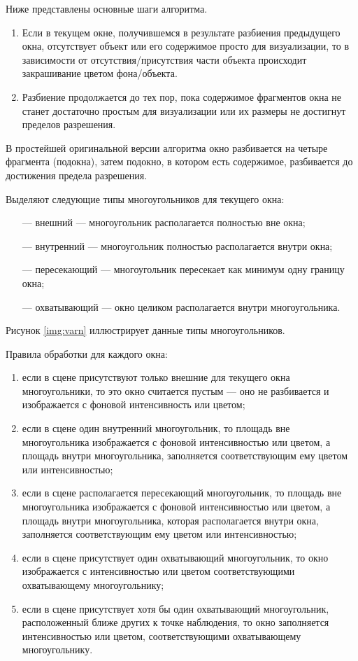 \begin{enumerate}
Ниже представлены основные шаги алгоритма.
\begin{enumerate} 
	\item Если в текущем окне, получившемся в результате разбиения предыдущего окна, отсутствует объект или его содержимое просто для визуализации, то в зависимости от отсутствия/присутствия части объекта происходит закрашивание цветом фона/объекта.
	\item Разбиение продолжается до тех пор, пока содержимое фрагментов окна не станет достаточно простым для визуализации или их размеры не достигнут пределов разрешения.
\end{enumerate}

В простейшей оригинальной версии алгоритма окно разбивается на четыре фрагмента (подокна), затем подокно, в котором есть содержимое, разбивается до достижения предела разрешения.

Выделяют следующие типы многоугольников для текущего окна:
\begin{itemize}
	\item[---] внешний --- многоугольник располагается полностью вне окна;
	\item[---] внутренний --- многоугольник полностью располагается внутри окна;
	\item[---] пересекающий --- многоугольник пересекает как минимум одну границу окна;
	\item[---] охватывающий --- окно целиком располагается внутри многоугольника.
\end{itemize}

Рисунок \ref{img:varn} иллюстрирует данные типы многоугольников.


Правила обработки для каждого окна:
\begin{enumerate}
	\item если в сцене присутствуют только внешние для текущего окна многоугольники, то это окно считается пустым --- оно не разбивается и изображается с фоновой интенсивность или цветом;
	\item если в сцене один внутренний многоугольник, то площадь вне многоугольника изображается с фоновой интенсивностью или цветом, а площадь внутри многоугольника, заполняется соответствующим ему цветом или интенсивностью;
	\item если в сцене располагается пересекающий многоугольник, то площадь вне многоугольника изображается с фоновой интенсивностью или цветом, а площадь внутри многоугольника, которая располагается внутри окна, заполняется соответствующим ему цветом или интенсивностью;
	\item если в сцене присутствует один охватывающий многоугольник, то окно изображается с интенсивностью или цветом соответствующими охватывающему многоугольнику;
	\item если в сцене присутствует хотя бы один охватывающий многоугольник, расположенный ближе других к точке наблюдения, то окно заполняется интенсивностью или цветом, соответствующими охватывающему многоугольнику.
\end{enumerate}


\end{enumerate}
